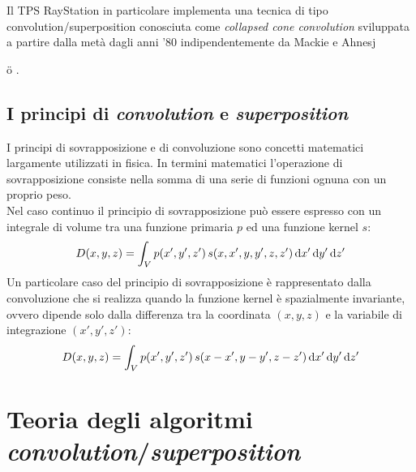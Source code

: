 Il TPS RayStation in particolare implementa una tecnica di tipo convolution/superposition conosciuta come \textit{collapsed cone convolution} sviluppata a partire dalla metà dagli anni '80 indipendentemente da Mackie e Ahnesj{\"{o} \cite{Ahnesjo1989, Boyer1998, Mackie1985, Ahnesjo1987}.

\subsection{I principi di \textit{convolution} e \textit{superposition}}
I principi di sovrapposizione e di convoluzione sono concetti matematici largamente utilizzati in fisica. In termini matematici l'operazione di sovrapposizione consiste nella somma di una serie di funzioni ognuna con un proprio peso.\\
Nel caso continuo il principio di sovrapposizione può essere espresso con un integrale di volume tra una funzione primaria $p$ ed una funzione kernel $s$:
\begin{equation}
D(x,y,z) = \int_V p(x',y',z')\, s(x,x',y,y',z,z')\,\text{d} x' \,\text{d} y' \,\text{d} z'
\end{equation}
Un particolare caso del principio di sovrapposizione è rappresentato dalla convoluzione che si realizza quando la funzione kernel è spazialmente invariante, ovvero dipende solo dalla differenza tra la coordinata $(x,y,z)$ e la variabile di integrazione $(x',y',z')$:
\begin{equation}
D(x,y,z) = \int_V p(x',y',z')\, s(x-x',y-y',z-z')\,\text{d} x' \,\text{d} y' \,\text{d} z'
\end{equation}



\section{Teoria degli algoritmi \textit{convolution}/\textit{superposition}}
\label{sec:teoria_conv}

}
